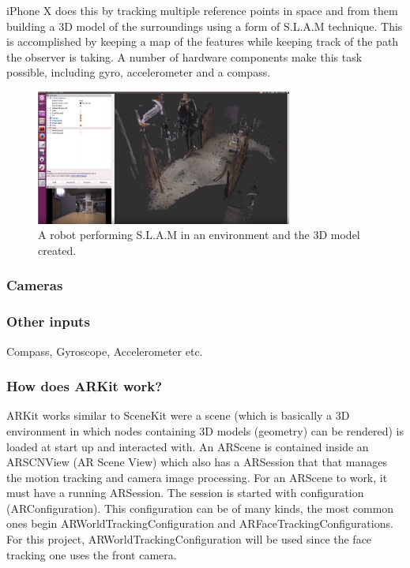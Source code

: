 iPhone X does this by tracking multiple reference points in space and from them building a 3D model of the surroundings using a form of S.L.A.M technique.
This is accomplished by keeping a map of the features while keeping track of the path the observer is taking. A number of 
hardware components make this task possible, including gyro, accelerometer and a compass. \cite{iphoneslam}

\begin{figure}[hbtp]
\begin{center}
\includegraphics[width = 0.75\textwidth]{./Images/slam-map.jpg} 
\caption{A robot performing S.L.A.M in an environment and the 3D model created.}
\end{center}
\end{figure}

\subsubsection{Cameras}

\subsubsection{Other inputs}
Compass, Gyroscope, Accelerometer  etc.

\subsubsection{How does ARKit work?}
ARKit works similar to SceneKit were a scene (which is basically a 3D environment in which nodes containing 3D models (geometry) can be rendered) is loaded at start up and interacted with.
An ARScene is contained inside an ARSCNView (AR Scene View) which also has a ARSession
that that manages the motion tracking and camera image processing. For an ARScene to work, it must have a running ARSession.
The session is started with configuration (ARConfiguration). This configuration can be of many kinds, the most common ones begin ARWorldTrackingConfiguration and ARFaceTrackingConfigurations. For this project, ARWorldTrackingConfiguration will be used since the face tracking one uses the front camera.

